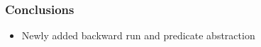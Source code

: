 \documentclass{beamer}
\begin{document}
\begin{frame}
\begin{center}
\begin{adjustbox}{max height=\textheight, max width=\textwidth}
\begin{tabular}{| l | l | r | r | r | r || l | l | r | r | r | r | r |}
        \hline
	\end{tabular}
	\label{tab:times}
	\end{adjustbox}	
	\end{center}

\end{frame}


\begin{frame}
  \frametitle{Conclusions}

  \begin{itemize}
	  \item Newly added backward run and predicate abstraction
  \end{itemize}

\end{frame}
\end{document}
